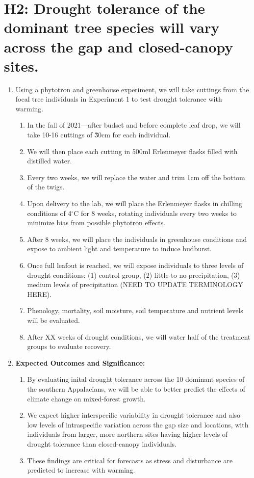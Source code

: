\documentclass{article}\usepackage[]{graphicx}\usepackage[]{color}
\begin{document}
\section*{ \textbf{H2: Drought tolerance of the dominant tree species will vary across the gap and closed-canopy sites.}}
\begin{enumerate}
\item Using a phytotron and greenhouse experiment, we will take cuttings from the focal tree individuals in Experiment 1 to test drought tolerance with warming. 
  \begin{enumerate}
  \item In the fall of 2021---after budset and before complete leaf drop, we will take 10-16 cuttings of \~30cm for each individual. 
  \item We will then place each cutting in 500ml Erlenmeyer flasks filled with distilled water. 
  \item Every two weeks, we will replace the water and trim 1cm off the bottom of the twigs.
  \item Upon delivery to the lab, we will place the Erlenmeyer flasks in chilling conditions of 4$^\circ{}$C for 8 weeks, rotating individuals every two weeks to minimize bias from possible phytotron effects. 
  \item After 8 weeks, we will place the individuals in greenhouse conditions and expose to ambient light and temperature to induce budburst. 
  \item Once full leafout is reached, we will expose individuals to three levels of drought conditions: (1) control group, (2) little to no precipitation, (3) medium levels of precipitation (NEED TO UPDATE TERMINOLOGY HERE).
  \item Phenology, mortality, soil moisture, soil temperature and nutrient levels will be evaluated.
  \item After XX weeks of drought conditions, we will water half of the treatment groups to evaluate recovery. 
  \end{enumerate}
  
\item \textbf{Expected Outcomes and Significance:}
  \begin{enumerate}
  \item By evaluating inital drought tolerance across the 10 dominant species of the southern Appalacians, we will be able to better predict the effects of climate change on mixed-forest growth.
  \item We expect higher interspecific variability in drought tolerance and also low levels of intraspecific variation across the gap size and locations, with individuals from larger, more northern sites having higher levels of drought tolerance than closed-canopy individuals. 
  \item These findings are critical for forecasts as stress and disturbance are predicted to increase with warming. 
  \end{enumerate}
\end{enumerate}
\end{document}
